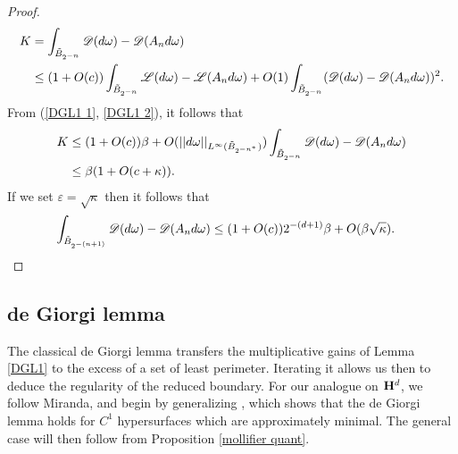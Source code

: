 \begin{proof}
\begin{align*}
K &= \int_{\tilde B_{2^{-n}}} \mathscr D(d\omega) - \mathscr D(A_n d\omega) \\
&\leq (1 + O(c)) \int_{\tilde B_{2^{-n}}} \mathscr L(d\omega) - \mathscr L(A_n d\omega) + O(1) \int_{\tilde B_{2^{-n}}} (\mathscr D(d\omega) - \mathscr D(A_n d\omega))^2.
\end{align*}
From (\ref{DGL1 1}, \ref{DGL1 2}), it follows that
\begin{align*}
K &\leq (1 + O(c))\beta + O(||d\omega||_{L^\infty(\tilde B_{2^{-n^*}})}) \int_{\tilde B_{2^{-n}}} \mathscr D(d\omega) - \mathscr D(A_n d\omega)\\
&\leq \beta(1 + O(c + \kappa)).
\end{align*}
If we set $\varepsilon = \sqrt \kappa$ then it follows that
\begin{align*}
\int_{\tilde B_{2^{-(n+1)}}} \mathscr D(d\omega) - \mathscr D(A_n d\omega) &\leq (1 + O(c)) 2^{-(d + 1)} \beta + O(\beta \sqrt \kappa). \qedhere
\end{align*}
\end{proof}


\subsection{de Giorgi lemma}
The classical de Giorgi lemma \cite{deGiorgi61} transfers the multiplicative gains of Lemma \ref{DGL1} to the excess of a set of least perimeter.
Iterating it allows us then to deduce the regularity of the reduced boundary.
For our analogue on $\mathbf H^d$, we follow Miranda, and begin by generalizing \cite[Teorema 4.4]{Miranda66}, which shows that the de Giorgi lemma holds for $C^1$ hypersurfaces which are approximately minimal.
The general case will then follow from Proposition \ref{mollifier quant}.

